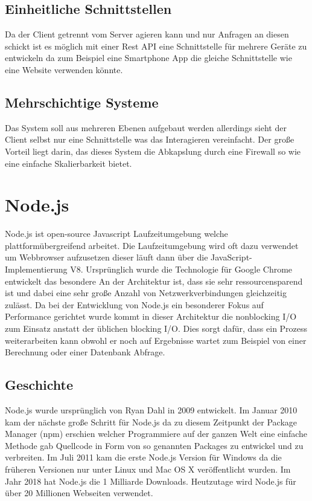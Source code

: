 		 	\subsection{Einheitliche Schnittstellen}
		 		Da der Client getrennt vom Server agieren kann und nur Anfragen an diesen schickt ist es möglich mit einer Rest API eine Schnittstelle für mehrere Geräte zu entwickeln da zum Beispiel eine Smartphone App die gleiche Schnittstelle wie eine Website verwenden könnte.
		 	
		 	\subsection{Mehrschichtige Systeme}
				Das System soll aus mehreren Ebenen aufgebaut werden allerdings sieht der Client selbst nur eine Schnittstelle was das Interagieren vereinfacht. Der große Vorteil liegt darin, das dieses System die Abkapslung durch eine Firewall so wie eine einfache Skalierbarkeit bietet.
		 	
		 \section{Node.js}
		 	Node.js ist open-source Javascript Laufzeitumgebung welche plattformübergreifend arbeitet. Die Laufzeitumgebung wird oft dazu verwendet um Webbrowser aufzusetzen dieser läuft dann über die JavaScript-Implementierung V8. Ursprünglich wurde die Technologie für Google Chrome entwickelt das besondere An der Architektur ist, dass sie sehr ressourcensparend ist und dabei eine sehr große Anzahl von Netzwerkverbindungen gleichzeitig zulässt. Da bei der Entwicklung von Node.js ein besonderer Fokus auf Performance gerichtet wurde kommt in dieser Architektur die nonblocking I/O zum Einsatz anstatt der üblichen blocking I/O. Dies sorgt dafür, dass ein Prozess weiterarbeiten kann obwohl er noch auf Ergebnisse wartet zum Beispiel von einer Berechnung oder einer Datenbank Abfrage. 
		 	
		 	\subsection{Geschichte}
		 		Node.js wurde ursprünglich von Ryan Dahl in 2009 entwickelt. Im Januar 2010 kam der nächste große Schritt für Node.js da zu diesem Zeitpunkt der Package Manager (npm) erschien welcher Programmiere auf der ganzen Welt eine einfache Methode gab Quellcode in Form von so genannten Packages zu entwickel und zu verbreiten. Im Juli 2011 kam die erste Node.js Version für Windows da die früheren Versionen nur unter Linux und Mac OS X veröffentlicht wurden. Im Jahr 2018 hat Node.js die 1 Milliarde Downloads. Heutzutage wird Node.js für über 20 Millionen Webseiten verwendet. 
		 		

